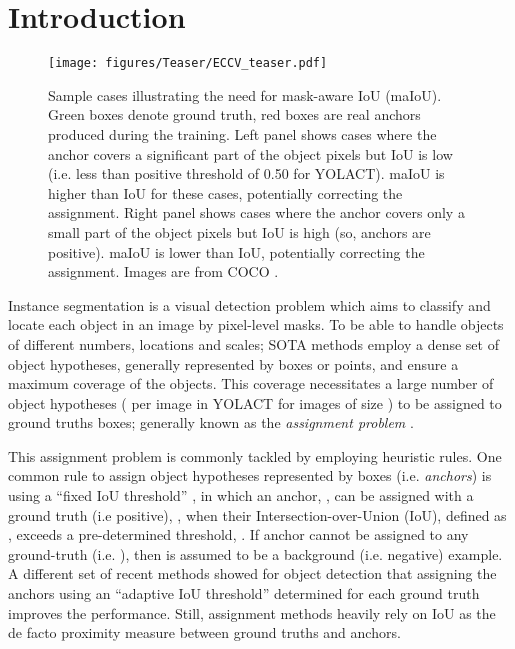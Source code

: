 \documentclass{bmvc2k}
\begin{document}
\section{Introduction}
\label{sec:Introduction}
\begin{figure}
    \centerline{
        \texttt{[image: figures/Teaser/ECCV\_teaser.pdf]}
    }
    \caption{Sample cases illustrating the need for mask-aware IoU (maIoU). Green boxes denote ground truth, red boxes are real anchors produced during the training. Left panel shows cases where the anchor covers a significant part of the object pixels but IoU is low (i.e. less than positive threshold of 0.50 for YOLACT). maIoU is higher than IoU for these cases, potentially correcting the assignment. Right panel shows cases where the anchor covers only a small part of the object pixels but IoU is high (so, anchors are positive). maIoU is lower than IoU, potentially correcting the assignment. Images are from COCO \cite{COCO}.\label{fig:Teaser}
} 
\end{figure}Instance segmentation is a visual detection problem which aims to classify and locate each object in an image by pixel-level masks. To be able to handle objects of different numbers, locations and scales; SOTA methods \cite{yolact,MaskRCNN,solov2} employ a dense set of object hypotheses, generally represented by boxes or points, and ensure a maximum coverage of the objects. This coverage necessitates a large number of object hypotheses ( per image in YOLACT \cite{yolact} for images of size ) to be assigned to  ground truths boxes;  generally known as the \textit{assignment problem} \cite{ATSS,paa}.


This assignment problem is commonly tackled by employing heuristic rules. One common rule to assign object hypotheses represented by boxes (i.e. \textit{anchors}) is using a ``fixed IoU threshold''  \cite{yolact,MaskRCNN,retinamask}, in which an anchor, , can be assigned with a ground truth (i.e positive), , when their Intersection-over-Union (IoU), defined as , exceeds a pre-determined threshold, . If anchor  cannot be assigned to any ground-truth  (i.e.  ), then  is assumed to be a background (i.e. negative) example. A different set of recent methods showed for object detection \cite{ATSS,paa,noisyanchor} that assigning the anchors using an ``adaptive IoU threshold'' determined for each ground truth improves the performance. Still, assignment methods heavily rely on IoU as the de facto proximity measure between ground truths and anchors.
\end{document}
